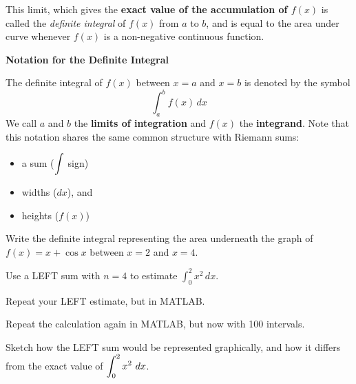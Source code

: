 This limit, which gives the {\bf exact value of the accumulation of
  $f(x)$} is called the {\em definite integral} of $f(x)$ from $a$ to
$b$, and is equal to the area under curve whenever $f(x)$ is a
non-negative continuous function.

  {\bf{Notation for the Definite Integral}} 
  
  The definite integral of $f(x)$ between $x=a$ and $x=b$ is denoted
  by the symbol $$\int_a^b f(x) \,dx$$ We call $a$ and $b$ the
  {\bf{limits of integration}} and $f(x)$ the {\bf{integrand}}.  Note
  that this notation shares the same common structure with Riemann
  sums:
\begin{itemize}
\item a sum ($\displaystyle \int $ sign) \\
\item widths ($dx$), and \\
\item heights ($f(x)$)
\end{itemize}

\newpage 

\problem Write the definite integral representing the area underneath
  the graph of $f(x) = x + \cos x$ between $x=2$ and $x=4$.

\vfill

\newpage

\problem Use a LEFT sum with $n=4$ to estimate
$\displaystyle \int_{0}^{2}x^2\,dx$.

\vfill

Repeat your LEFT estimate, but in MATLAB.  

\vfill Repeat the calculation again in MATLAB, but now with 100
intervals.

\vfill

\newpage

\vfill \problem Sketch how the LEFT sum would be represented
graphically, and how it differs from the exact value of
$\displaystyle \int_0^2 x^2~dx$.

\hfill

\newpage




